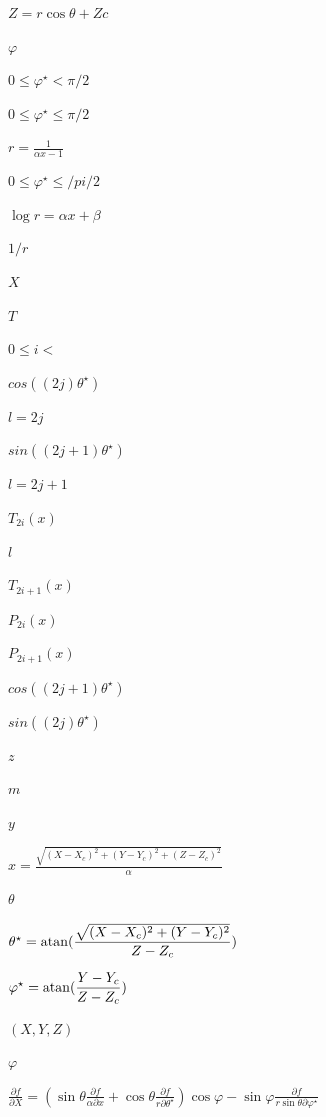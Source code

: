 \documentclass{article}
\begin{document}
$ Z = r \cos\theta + Zc $
\pagebreak

$\varphi $
\pagebreak

$ 0 \leq \varphi^\star < \pi /2 $
\pagebreak

$ 0 \leq \varphi^\star \leq \pi/2 $
\pagebreak

$ r = \displaystyle\frac{1}{\alpha x -1}$
\pagebreak

$ 0 \leq \varphi^\star \leq /pi /2 $
\pagebreak

$ \log r = \alpha x + \beta $
\pagebreak

$ 1/r $
\pagebreak

$ X $
\pagebreak

$ T $
\pagebreak

$ 0 \leq i < $
\pagebreak

$ cos((2j)\theta^\star)$
\pagebreak

$ l = 2j $
\pagebreak

$ sin((2j+1) \theta^\star)$
\pagebreak

$ l = 2j+1 $
\pagebreak

$ T_{2i} (x)$
\pagebreak

$ l $
\pagebreak

$ T_{2i+1} (x)$
\pagebreak

$ P_{2i} (x)$
\pagebreak

$ P_{2i+1} (x)$
\pagebreak

$ cos((2j+1)\theta^\star)$
\pagebreak

$ sin((2j) \theta^\star)$
\pagebreak

$z$
\pagebreak

$ m$
\pagebreak

$y$
\pagebreak

$ x = \displaystyle\frac{\sqrt{(X-X_c)^2+(Y-Y_c)^2+(Z-Z_c)^2}}{\alpha} $
\pagebreak

$ \theta$
\pagebreak

$ \theta^\star = {\rm atan} (\displaystyle\frac{\sqrt{(X-X_c)^2+(Y-Y_c)^2}}{Z-Z_c}) $
\pagebreak

$ \varphi^\star = {\rm atan} (\displaystyle\frac{Y-Y_c}{Z-Z_c}) $
\pagebreak

$ (X, Y, Z) $
\pagebreak

$ \varphi$
\pagebreak

$ \displaystyle\frac{\partial f}{\partial X} = (\sin\theta \displaystyle\frac{\partial f}{\alpha\partial x} + \cos\theta \displaystyle\frac{\partial f}{r\partial \theta^\star}) \cos\varphi - \sin\varphi \displaystyle\frac{\partial f}{r\sin\theta \partial \varphi^\star} $
\pagebreak
\end{document}
